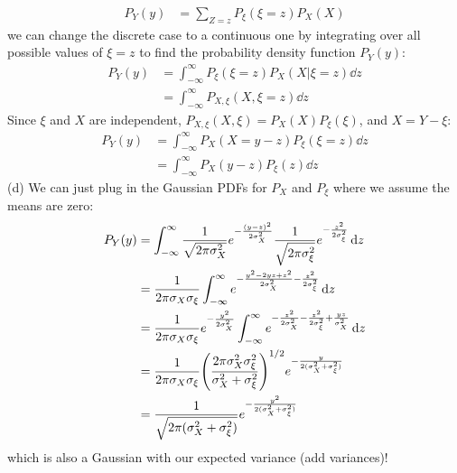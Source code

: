 \documentclass[../main.tex]{subfiles}
\begin{document}
\begin{align*}
    P_Y(y) &= \sum_{Z=z} P_\xi(\xi = z) P_X(X)
\end{align*} 
we can change the discrete case to a continuous one by integrating over all 
possible values of $\xi = z$ to find the probability density function $P_Y(y)$:
\begin{align*}
    P_Y(y) &= \int_{-\infty}^\infty P_\xi(\xi = z) P_X(X|\xi = z) \dd{z} \\
    &= \int_{-\infty}^\infty P_{X,\xi}(X, \xi = z) \dd{z}
\end{align*}
Since $\xi$ and $X$ are independent, $P_{X,\xi}(X, \xi) = P_X(X) P_\xi(\xi)$, and $X = Y - \xi$:
\begin{align*}
    P_Y(y) &= \int_{-\infty}^\infty P_X(X = y - z) P_\xi(\xi = z) \dd{z} \\
    &= \int_{-\infty}^\infty P_X(y - z) P_\xi(z) \dd{z}
\end{align*}
(d) We can just plug in the Gaussian PDFs for $P_X$ and $P_\xi$ where we assume the means are zero:
\begin{align*}
    P_Y(y) &= \int_{-\infty}^\infty \frac{1}{\sqrt{2\pi\sigma_X^2}} e^{-\frac{(y - z)^2}{2\sigma_X^2}} 
        \frac{1}{\sqrt{2\pi\sigma_\xi^2}} e^{-\frac{z^2}{2\sigma_\xi^2}} \dd{z} \\
    &= \frac{1}{2\pi\sigma_X\sigma_\xi} \int_{-\infty}^\infty e^{-\frac{y^2 - 2yz + z^2}{2\sigma_X^2} - \frac{z^2}{2\sigma_\xi^2}} \dd{z} \\
    &= \frac{1}{2\pi\sigma_X \sigma_\xi} e^{-\frac{y^2}{2\sigma_X^2}} \int_{-\infty}^\infty e^{-\frac{z^2}{2\sigma_X^2} - \frac{z^2}{2\sigma_\xi^2} + \frac{yz}{\sigma_X^2}} \dd{z} \\
    &= \frac{1}{2\pi\sigma_X \sigma_\xi} \qt(\frac{2\pi\sigma_X^2\sigma_\xi^2}{\sigma_X^2 + \sigma_\xi^2})^{1/2}
        e^{-\frac{y}{2(\sigma_X^2 + \sigma_\xi^2)}} \\
    &= \frac{1}{\sqrt{2\pi(\sigma_X^2 + \sigma_\xi^2)}} e^{-\frac{y^2}{2(\sigma_X^2 + \sigma_\xi^2)}}
\end{align*}
which is also a Gaussian with our expected variance (add variances)!
\end{document}
